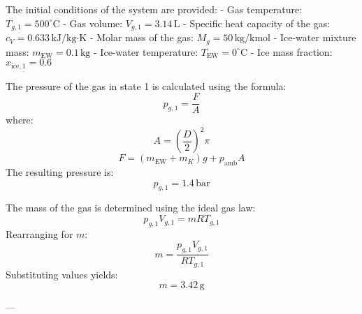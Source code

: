 The initial conditions of the system are provided:  
- Gas temperature: \( T_{g,1} = 500^\circ\text{C} \)  
- Gas volume: \( V_{g,1} = 3.14 \, \text{L} \)  
- Specific heat capacity of the gas: \( c_V = 0.633 \, \text{kJ/kg·K} \)  
- Molar mass of the gas: \( M_g = 50 \, \text{kg/kmol} \)  
- Ice-water mixture mass: \( m_{\text{EW}} = 0.1 \, \text{kg} \)  
- Ice-water temperature: \( T_{\text{EW}} = 0^\circ\text{C} \)  
- Ice mass fraction: \( x_{\text{ice},1} = 0.6 \)  

The pressure of the gas in state 1 is calculated using the formula:  
\[
p_{g,1} = \frac{F}{A}
\]  
where:  
\[
A = \left( \frac{D}{2} \right)^2 \pi
\]  
\[
F = (m_{\text{EW}} + m_K) g + p_{\text{amb}} A
\]  
The resulting pressure is:  
\[
p_{g,1} = 1.4 \, \text{bar}
\]  

The mass of the gas is determined using the ideal gas law:  
\[
p_{g,1} V_{g,1} = m R T_{g,1}
\]  
Rearranging for \( m \):  
\[
m = \frac{p_{g,1} V_{g,1}}{R T_{g,1}}
\]  
Substituting values yields:  
\[
m = 3.42 \, \text{g}
\]  

---